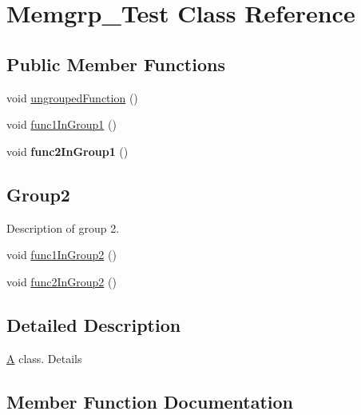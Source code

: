 \hypertarget{class_memgrp___test}{}\section{Memgrp\+\_\+\+Test Class Reference}
\label{class_memgrp___test}
\subsection*{Public Member Functions}
\begin{DoxyCompactItemize}
\item 
void \mbox{\hyperlink{class_memgrp___test_a8a3a4ac34b2e25696159ac420bd4bdc6}{ungrouped\+Function}} ()
\end{DoxyCompactItemize}
\textbf{ }\par
\begin{DoxyCompactItemize}
\item 
void \mbox{\hyperlink{class_memgrp___test_a5052066c03efb51395b5334da4255cd2}{func1\+In\+Group1}} ()
\item 
\mbox{\label{class_memgrp___test_a8296fa2c355e84ecf25522d54807548c}} 
void {\bfseries func2\+In\+Group1} ()
\end{DoxyCompactItemize}

\subsection*{Group2}
\label{_amgrp6be2faefeff8740e94471f5ae04da6d0}%
Description of group 2. \begin{DoxyCompactItemize}
\item 
void \mbox{\hyperlink{class_memgrp___test_ab0e6553ddc36ac3cef0ac229c5dd4cdb}{func1\+In\+Group2}} ()
\item 
void \mbox{\hyperlink{class_memgrp___test_a9ce862049bb543596343e81ad3ddddff}{func2\+In\+Group2}} ()
\end{DoxyCompactItemize}


\subsection{Detailed Description}
\mbox{\hyperlink{class_a}{A}} class. Details 

\subsection{Member Function Documentation}
\mbox{\label{class_memgrp___test_a5052066c03efb51395b5334da4255cd2}} 
